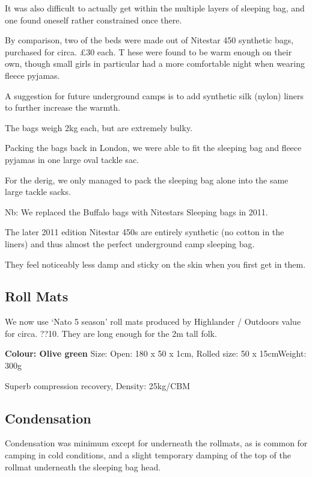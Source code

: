 It was also difficult to actually get within the multiple layers of
sleeping bag, and one found oneself rather constrained once there.

By comparison, two of the beds were made out of Nitestar 450 synthetic
bags, purchased for circa. £30 each. T hese were found to be warm enough
on their own, though small girls in particular had a more comfortable
night when wearing fleece pyjamas.

A suggestion for future underground camps is to add synthetic silk
(nylon) liners to further increase the warmth.

The bags weigh 2kg each, but are extremely bulky.

Packing the bags back in London, we were able to fit the sleeping bag
and fleece pyjamas in one large oval tackle sac.

For the derig, we only managed to pack the sleeping bag alone into the
same large tackle sacks.

Nb: We replaced the Buffalo bags with Nitestars Sleeping bags in 2011.

The later 2011 edition Nitestar 450s are entirely synthetic (no cotton
in the liners) and thus almost the perfect underground camp sleeping
bag.

They feel noticeably less damp and sticky on the skin when you first get
in them.

\hypertarget{roll-mats}{%
\subsection{Roll Mats}\label{roll-mats}}

We now use `Nato 5 season' roll mats produced by Highlander / Outdoors
value for circa. ??10. They are long enough for the 2m tall folk.

\textbf{Colour: Olive green} Size: Open: 180 x 50 x 1cm, Rolled size: 50
x 15cmWeight: 300g

Superb compression recovery, Density: 25kg/CBM

\hypertarget{condensation}{%
\subsection{Condensation}\label{condensation}}

Condensation was minimum except for underneath the rollmats, as is
common for camping in cold conditions, and a slight temporary damping of
the top of the rollmat underneath the sleeping bag head.

